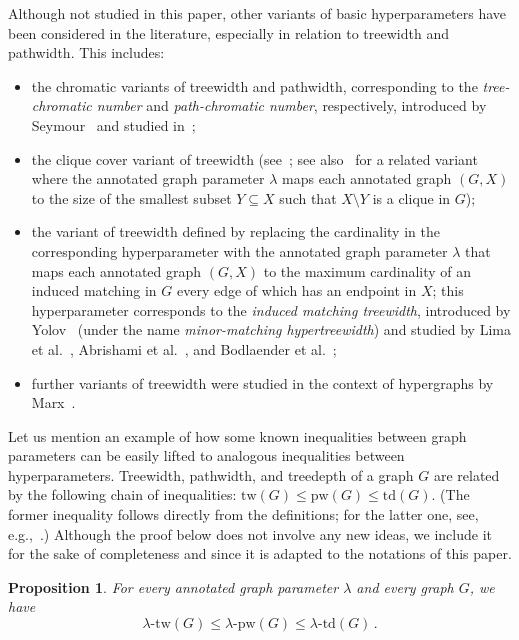 \documentclass[11pt]{article}
\newcommand{\td}{\mathrm{td}}
\newcommand{\tw}{\mathrm{tw}}
\newcommand{\pw}{\mathrm{pw}}
\theoremstyle{plain}
\newtheorem{proposition}[theorem]{Proposition}
\theoremstyle{definition}
\theoremstyle{remark}
\numberwithin{equation}{section}
\begin{document}
Although not studied in this paper, other variants of basic hyperparameters have been considered in the literature, especially in relation to treewidth and pathwidth. 
This includes:
\begin{itemize}
    \item the chromatic variants of treewidth and pathwidth, corresponding to the \emph{tree-chromatic number} and \emph{path-chromatic number}, respectively, introduced by Seymour~\cite{MR3425243} and studied in~\cite{huynhkim17,BARRERACRUZ2019206,Huynh2021};

    \item the clique cover variant of treewidth (see~\cite{doi:10.1137/20M1320870,abrishami2023tree}; see also~\cite{zbMATH07567466,zbMATH07365274} for a related variant where the annotated graph parameter $\lambda$ maps each annotated graph $(G,X)$ to the size of the smallest subset $Y \subseteq X$ such that $X\setminus Y$ is a clique in $G$);
    
\item the variant of treewidth defined by replacing the cardinality in the corresponding hyperparameter with the annotated graph parameter $\lambda$ that maps each annotated graph $(G,X)$ to the maximum cardinality of an induced matching in $G$ every edge of which has an endpoint in $X$; this hyperparameter corresponds to the \emph{induced matching treewidth}, introduced  by Yolov~\cite{MR3775804} (under the name \emph{minor-matching hypertreewidth}) and studied by Lima et al.~\cite{LMMORS24}, Abrishami et al.~\cite{abrishami2024excludingcliquebicliquegraphs}, and Bodlaender et al.~\cite{bodlaender2025findingsparseinducedsubgraphs};

\item further variants of treewidth were studied in the context of hypergraphs by Marx~\cite{MR3144912}.
\end{itemize}

Let us mention an example of how some known inequalities between graph parameters can be easily lifted to analogous inequalities between hyperparameters.
Treewidth, pathwidth, and treedepth of a graph $G$ are related by the following chain of inequalities: $\tw(G)\le \pw(G)\le \td(G)$. (The former inequality follows directly from the definitions; for the latter one, see, e.g.,~\cite{MR1317666,MR2920058}.)
Although the proof below does not involve any new ideas, we include it for the sake of completeness and since it is adapted to the notations of this paper.

\begin{proposition}\label{prop:eta}
For every annotated graph parameter $\lambda$ and every graph $G$, we have
\[\lambda\text{-}\tw(G)\le \lambda\text{-}\pw(G)\le \lambda\text{-}\td(G)\,.\]
\end{proposition}
\end{document}
